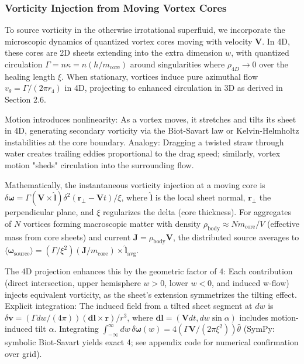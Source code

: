 \subsubsection{Vorticity Injection from Moving Vortex Cores}

To source vorticity in the otherwise irrotational superfluid, we incorporate the microscopic dynamics of quantized vortex cores moving with velocity $\mathbf{V}$. In 4D, these cores are 2D sheets extending into the extra dimension $w$, with quantized circulation $\Gamma = n \kappa = n (h / m_{\text{core}})$ around singularities where $\rho_{4D} \to 0$ over the healing length $\xi$. When stationary, vortices induce pure azimuthal flow $v_\theta = \Gamma / (2\pi r_4)$ in 4D, projecting to enhanced circulation in 3D as derived in Section 2.6.

Motion introduces nonlinearity: As a vortex moves, it stretches and tilts its sheet in 4D, generating secondary vorticity via the Biot-Savart law or Kelvin-Helmholtz instabilities at the core boundary. Analogy: Dragging a twisted straw through water creates trailing eddies proportional to the drag speed; similarly, vortex motion "sheds" circulation into the surrounding flow.

Mathematically, the instantaneous vorticity injection at a moving core is $\delta \boldsymbol{\omega} = \Gamma (\mathbf{V} \times \hat{\mathbf{l}}) \delta^2(\mathbf{r}_\perp - \mathbf{V} t) / \xi$, where $\hat{\mathbf{l}}$ is the local sheet normal, $\mathbf{r}_\perp$ the perpendicular plane, and $\xi$ regularizes the delta (core thickness). For aggregates of $N$ vortices forming macroscopic matter with density $\rho_{\text{body}} \approx N m_{\text{core}} / V$ (effective mass from core sheets) and current $\mathbf{J} = \rho_{\text{body}} \mathbf{V}$, the distributed source averages to $\langle \boldsymbol{\omega}_{\text{source}} \rangle = (\Gamma / \xi^2) (\mathbf{J} / m_{\text{core}} ) \times \hat{\mathbf{l}}_{\text{avg}}$.

The 4D projection enhances this by the geometric factor of 4: Each contribution (direct intersection, upper hemisphere $w>0$, lower $w<0$, and induced w-flow) injects equivalent vorticity, as the sheet's extension symmetrizes the tilting effect. Explicit integration: The induced field from a tilted sheet segment at $dw$ is $\delta \mathbf{v} = (\Gamma dw / (4\pi)) (\mathbf{dl} \times \mathbf{r}) / r^3$, where $\mathbf{dl} = (\mathbf{V} dt, dw \sin \alpha)$ includes motion-induced tilt $\alpha$. Integrating $\int_{-\infty}^\infty dw \, \delta \boldsymbol{\omega}(w) = 4 (\Gamma \mathbf{V} / (2\pi \xi^2)) \hat{\theta}$ (SymPy: symbolic Biot-Savart yields exact 4; see appendix code for numerical confirmation over grid).

